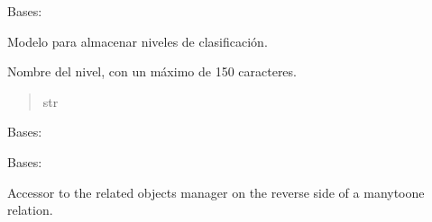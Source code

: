 \documentclass[letterpaper,10pt,spanish]{sphinxmanual}
\begin{document}
\begin{fulllineitems}

\pysigstartsignatures
{}
\pysigstopsignatures
\sphinxAtStartPar
Bases: 

\sphinxAtStartPar
Modelo para almacenar niveles de clasificación.


\begin{fulllineitems}

\pysigstartsignatures
{}
\pysigstopsignatures
\sphinxAtStartPar
Nombre del nivel, con un máximo de 150 caracteres.
\begin{quote}\begin{description}
\sphinxAtStartPar
str

\end{description}\end{quote}

\end{fulllineitems}



\begin{fulllineitems}

\pysigstartsignatures
{}
\pysigstopsignatures
\sphinxAtStartPar
Bases: 

\end{fulllineitems}



\begin{fulllineitems}

\pysigstartsignatures
{}
\pysigstopsignatures
\sphinxAtStartPar
Bases: 

\end{fulllineitems}



\begin{fulllineitems}

\pysigstartsignatures
{}
\pysigstopsignatures
\sphinxAtStartPar
Accessor to the related objects manager on the reverse side of a
many\sphinxhyphen{}to\sphinxhyphen{}one relation.


\end{fulllineitems}
\end{fulllineitems}
\end{document}
